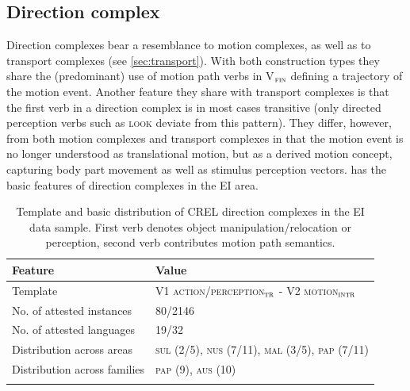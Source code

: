 \subsection{Direction complex} \label{sec:direction}
Direction complexes bear a resemblance to motion complexes, as well as to transport complexes (see \ref{sec:transport}). With both construction types they share the (predominant) use of motion path verbs in V$_{\textsc{fin}}$ defining a trajectory of the motion event. Another feature they share with transport complexes is that the first verb in a direction complex is in most cases transitive (only directed perception verbs such as \textsc{look} deviate from this pattern). They differ, however, from both motion complexes and transport complexes in that the motion event is no longer understood as translational motion, but as a derived motion concept, capturing body part movement as well as stimulus perception vectors.  has the basic features of direction complexes in the EI area.

\begin{table}
\begin{tabular}{ll}
\lsptoprule
Feature&Value\tabularnewline
\midrule
Template&V1 \textsc{action/perception$_{\textsc{tr}}$} - V2 \textsc{motion$_\textsc{intr}$}\tabularnewline
No. of attested instances& 80/2146 \tabularnewline
No. of attested languages& 19/32 \tabularnewline
Distribution across areas& \textsc{sul} (2/5), \textsc{nus} (7/11), \textsc{mal} (3/5), \textsc{pap} (7/11) \tabularnewline
Distribution across families& \textsc{pap} (9), \textsc{aus} (10) \tabularnewline
\lspbottomrule
\end{tabular}
\caption[Template and basic distribution of CREL direction complexes]{Template and basic distribution of CREL direction complexes in the EI data sample. First verb denotes object manipulation/relocation or perception, second verb contributes motion path semantics.}
\label{table:basiccreldir}
\end{table}


